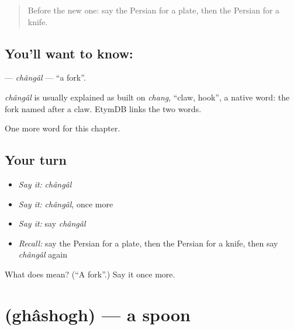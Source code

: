 \label{lesson:FA-C47-changal}



\begin{quote}
Before the new one: say the Persian for a plate, then the Persian for a knife.
\end{quote}

\subsection*{You'll want to know: }
\textbf{} — \emph{chângâl} — \textquotedblleft{}a fork\textquotedblright{}.

\begin{cousinweb}
\emph{chângâl} is usually explained as built on \emph{chang}, \textquotedblleft{}claw, hook\textquotedblright{}, a native word: the fork named after a claw. EtymDB links the two words.
\end{cousinweb}

\begin{grammarlens}[title={What you've built}]
One more word for this chapter.
\end{grammarlens}

\subsection*{Your turn}
\begin{itemize}
\raggedright
  \item \emph{Say it:} \emph{chângâl}
  \item \emph{Say it:} \emph{chângâl}, once more
  \item \emph{Say it:} say \emph{chângâl}
  \item \emph{Recall:} say the Persian for a plate, then the Persian for a knife, then say \emph{chângâl} again
\end{itemize}

\begin{tcolorbox}[breakable,colback=teal!4,colframe=teal!35!black,title={Before you move on}]
What does  mean? (\textquotedblleft{}A fork\textquotedblright{}.) Say it once more.
\end{tcolorbox}
\section[\texorpdfstring{\fa{قاشق} (ghâshogh)}{قاشق (ghâshogh)}]{ (ghâshogh) — a spoon}

\label{lesson:FA-C47-ghashogh}



